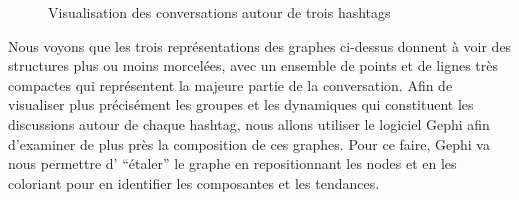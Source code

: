 \begin{figure}[th]
    \centering


  
    \caption{Visualisation des conversations autour de trois hashtags}
\end{figure}


Nous voyons que les trois repr\'esentations des graphes ci-dessus
donnent \`a voir des structures plus ou moins morcel\'ees, avec un
ensemble de points et de lignes tr\`es compactes qui repr\'esentent la
majeure partie de la conversation. Afin de visualiser plus
pr\'ecis\'ement les groupes et les dynamiques qui constituent les
discussions autour de chaque hashtag, nous allons utiliser le logiciel
Gephi \citep{Bastian2009} afin d{\textquoteright}examiner de plus pr\`es la
composition de ces graphes. Pour ce faire, Gephi va nous permettre
d{\textquoteright} {\textquotedblleft}\'etaler{\textquotedblright} le
graphe en repositionnant les nodes et en les coloriant pour en
identifier les composantes et les tendances.

